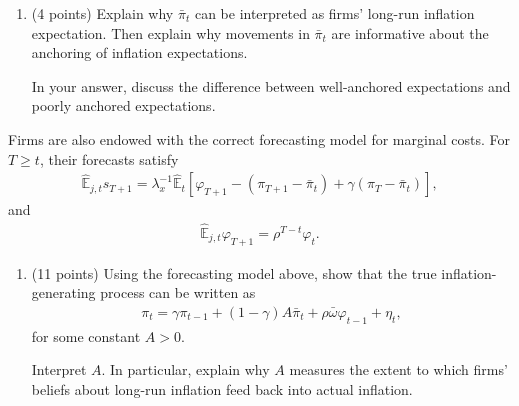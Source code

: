 \documentclass[12pt]{article}
\begin{document}
\begin{enumerate}[label=\arabic*.]
    \begin{enumerate}[label=(\alph*), resume]
    
        \item (4 points) Explain why $\bar{\pi}_t$ can be interpreted as firms' long-run inflation expectation. Then explain why movements in $\bar{\pi}_t$ are informative about the anchoring of inflation expectations.

        In your answer, discuss the difference between well-anchored expectations and poorly anchored expectations.
    
    \end{enumerate}

    Firms are also endowed with the correct forecasting model for marginal costs. For $T\geq t$, their forecasts satisfy
\begin{align*}
    \hat{\mathbb{E}}_{j,t}s_{T+1}
    =
    \lambda_x^{-1}
    \hat{\mathbb{E}}_t
    \left[
    \varphi_{T+1}
    -
    (\pi_{T+1}-\bar{\pi}_t)
    +
    \gamma(\pi_T-\bar{\pi}_t)
    \right],
\end{align*}
and
\begin{align*}
    \hat{\mathbb{E}}_{j,t}\varphi_{T+1}
    =
    \rho^{T-t}\varphi_t.
\end{align*}

\begin{enumerate}[label=(\alph*), resume]

    \item (11 points)
    Using the forecasting model above, show that the true inflation-generating process can be written as
    \begin{align*}
        \pi_t
        =
        \gamma\pi_{t-1}
        +
        (1-\gamma)A\bar{\pi}_t
        +
        \rho\bar{\omega}\varphi_{t-1}
        +
        \eta_t,
    \end{align*}
    for some constant $A>0$.

    Interpret $A$. In particular, explain why $A$ measures the extent to which firms' beliefs about long-run inflation feed back into actual inflation.
\end{enumerate}
\end{enumerate}
\end{document}
